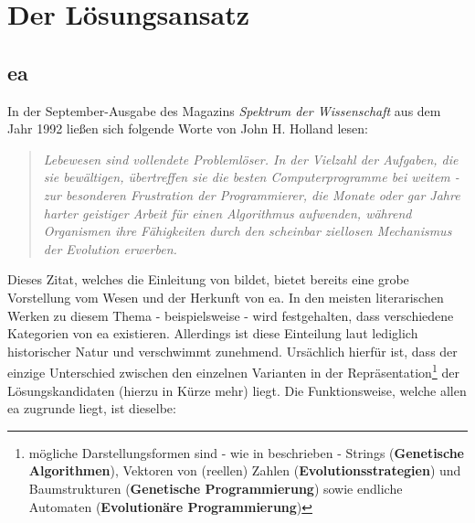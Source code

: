 \chapter{Der Lösungsansatz}
\label{sec:ex}

	\section{\gls{ea}}
	\label{sec:evol}
	
	In der September-Ausgabe des Magazins \textit{Spektrum der Wissenschaft} \cite{j-h-holland} aus dem Jahr 1992 ließen sich folgende Worte von John H. Holland lesen: \\
	
	\begin{quote}
		\textit{Lebewesen sind vollendete Problemlöser. In der Vielzahl der Aufgaben, die sie bewältigen, übertreffen sie die besten Computerprogramme bei weitem - zur besonderen Frustration der Programmierer, die Monate oder gar Jahre harter geistiger Arbeit für einen Algorithmus aufwenden, während Organismen ihre Fähigkeiten durch den scheinbar ziellosen Mechanismus der Evolution erwerben. \\}
	\end{quote}
	
	Dieses Zitat, welches die Einleitung von \cite{ger-kla-kru-intro} bildet, bietet bereits eine grobe Vorstellung vom Wesen und der Herkunft von \gls{ea}. In den meisten literarischen Werken zu diesem Thema - beispielsweise \cite{ger-kla-kru-intro, eib-smi-ea} - wird festgehalten, dass verschiedene Kategorien von \gls{ea} existieren. Allerdings ist diese Einteilung laut \cite{eib-smi-ea} lediglich historischer Natur und verschwimmt zunehmend. Ursächlich hierfür ist, dass der einzige Unterschied zwischen den einzelnen Varianten in der Repräsentation\footnote{mögliche Darstellungsformen sind - wie in \cite{eib-smi-ea} beschrieben - Strings (\textbf{Genetische Algorithmen}), Vektoren von (reellen) Zahlen (\textbf{Evolutionsstrategien}) und Baumstrukturen (\textbf{Genetische Programmierung}) sowie endliche Automaten (\textbf{Evolutionäre Programmierung})} der Lösungskandidaten (hierzu in Kürze mehr) liegt. Die Funktionsweise, welche allen \gls{ea} zugrunde liegt, ist dieselbe: \\
	
